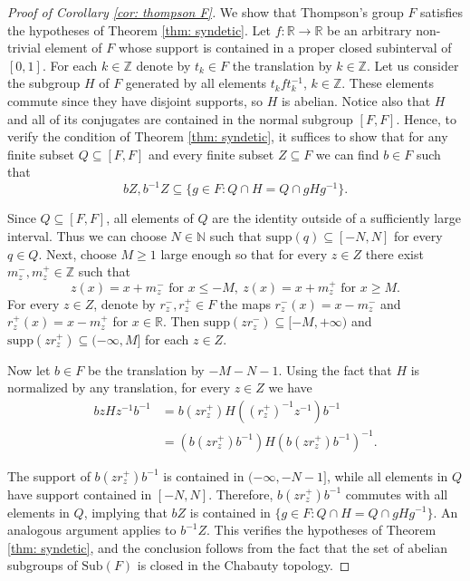 \documentclass[reqno,a4paper,11pt]{amsart}
\numberwithin{equation}{section}
\newcommand{\1}{\mathbf{1}}
\def\N{{\mathbb N}}
\def\R{{\mathbb R}}
\def\Z{{\mathbb Z}}
\theoremstyle{definition}
\begin{document}
	\begin{proof}[Proof of Corollary \ref{cor: thompson F}]
		We show that Thompson's group $F$ satisfies the hypotheses of Theorem \ref{thm: syndetic}. Let $f \colon \R\to \R$ be an arbitrary non-trivial element of $F$ whose support is contained in a proper closed subinterval of $[0,1]$. For each $k\in \Z$ denote by $t_k\in F$ the translation by $k \in \Z$. Let us consider the subgroup $H$ of $F$ generated by all elements $t_k f t_k^{-1}$, $k\in \Z$. These elements commute since they have disjoint supports, so $H$ is abelian. Notice also that $H$ and all of its conjugates are contained in the normal subgroup $[F,F]$. Hence, to verify the condition of Theorem \ref{thm: syndetic}, it suffices to show that for any finite subset $Q\subseteq [F,F]$ and every finite subset $Z\subseteq F$ we can find $b\in F$ such that
		\[
		bZ, b^{-1}Z \subseteq \{g\in F : Q\cap H= Q\cap gHg^{-1}\}.
		\]
		
		Since $Q \subseteq [F,F]$, all elements of $Q$ are the identity outside of a sufficiently large interval. Thus we can choose $N\in \N$ such that $\mathrm{supp}(q)\subseteq [-N,N]$ for every $q\in Q$. Next, choose $M\ge 1$ large enough so that for every $z\in Z$ there exist $m_{z}^{-},m_{z}^{+}\in \Z$ such that
		\[
		z(x)=x+m_{z}^{-} \text{ for } x\le -M,  \ z(x)=x+m_{z}^{+} \text{ for }  x\ge M.
		\]
		For every $z\in Z$, denote by $r_z^{-},r_z^{+} \in F$ the maps $r_z^{-}(x)=x-m_z^{-}$ and $r_z^{+}(x)=x-m_z^{+}$ for $x\in \R$. Then $\mathrm{supp}(zr_z^{-})\subseteq [-M,+\infty)$ and $\mathrm{supp}(zr_z^{+})\subseteq (-\infty,M]$ for each $z\in Z$.
		
		Now let $b\in F$ be the translation by $-M-N-1$. Using the fact that $H$ is normalized by any translation, for every $z \in Z$ we have
		\begin{align*}
			bzHz^{-1}b^{-1}&=b(zr^{+}_z)H((r_z^{+})^{-1}z^{-1})b^{-1}  \\
			&=(b(zr^{+}_z)b^{-1}) H (b(zr^{+}_z)b^{-1})^{-1}.
		\end{align*}
		
		The support of $b(zr^{+}_z)b^{-1}$ is contained in $(-\infty, -N-1]$, while all elements in $Q$ have support contained in $[-N,N]$. Therefore, $b(zr^{+}_z)b^{-1}$ commutes with all elements in $Q$, implying that $bZ$ is contained in $\{g\in F : Q\cap H=Q\cap gHg^{-1}\}$. An analogous argument applies to $b^{-1}Z$. This verifies the hypotheses of Theorem \ref{thm: syndetic}, and the conclusion follows from the fact that the set of abelian subgroups of $\mathrm{Sub}(F)$ is closed in the Chabauty topology.
	\end{proof}
	
\end{document}
